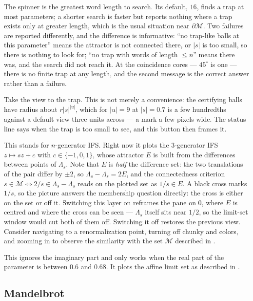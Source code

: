 \documentclass{amsart}
\begin{document}
\begin{description}
The spinner is the greatest word length to search.  Its default, $16$, finds a trap at most
parameters; a shorter search is faster but reports nothing where a trap exists only at
greater length, which is the usual situation near $\partial\mathcal{M}$.  Two failures are
reported differently, and the difference is informative: ``no trap-like balls at this
parameter'' means the attractor is not connected there, or $|s|$ is too small, so there is
nothing to look for; ``no trap with words of length $\le n$'' means there was, and the
search did not reach it.  At the coincidence cores --- $45^\circ$ is one --- there is no
finite trap at any length, and the second message is the correct answer rather than a
failure.

\item[to trap] Take the view to the trap.  This is not merely a convenience: the certifying
balls have radius about $r|s|^{|u|}$, which for $|u| = 9$ at $|s| = 0.7$ is a few hundredths
against a default view three units across --- a mark a few pixels wide.  The status line
says when the trap is too small to see, and this button then frames it.

\item[nIFS] This stands for $n$-generator IFS.  Right now it plots the 3-generator IFS
$z \mapsto sz + c$ with $c \in \{-1,0,1\}$, whose attractor $E$ is built from the
differences between points of $\Lambda_s$.  Note that $E$ is \emph{half} the difference
set: the two translations of the pair differ by $\pm 2$, so $\Lambda_s - \Lambda_s = 2E$,
and the connectedness criterion $s \in \mathcal{M} \iff 2/s \in \Lambda_s - \Lambda_s$
reads on the plotted set as $1/s \in E$.  A black cross marks $1/s$, so the picture answers
the membership question directly: the cross is either on the set or off it.  Switching this
layer on reframes the pane on $0$, where $E$ is centred and where the cross can be seen ---
$\Lambda_s$ itself sits near $1/2$, so the limit-set window would cut both of them off.
Switching it off restores the previous view.  Consider navigating to a renormalization
point, turning off chunky and colors, and zooming in to observe the similarity with the set
$\mathcal{M}$ described in \cite{paper}.
\item[2d IFS]  This ignores the imaginary part and only works when the real part of the 
parameter is between $0.6$ and $0.68$.  It plots the affine limit set as 
described in \cite{paper}.
\end{description}

\subsection{Mandelbrot}
\end{document}
